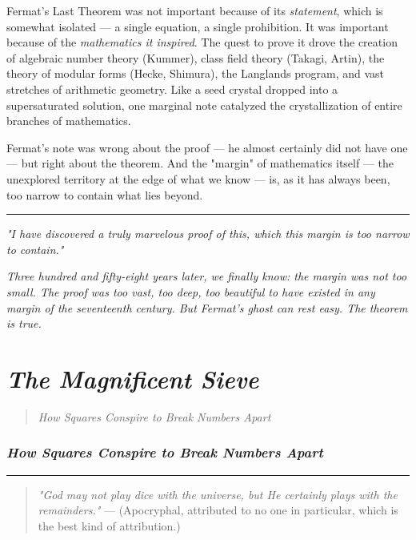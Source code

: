 \documentclass[11pt,openany]{book}
\theoremstyle{definition}
\theoremstyle{plain}
\theoremstyle{remark}
\begin{document}
Fermat's Last Theorem was not important because of its \textit{statement}, which is somewhat isolated — a single equation, a single prohibition. It was important because of the \textit{mathematics it inspired}. The quest to prove it drove the creation of algebraic number theory (Kummer), class field theory (Takagi, Artin), the theory of modular forms (Hecke, Shimura), the Langlands program, and vast stretches of arithmetic geometry. Like a seed crystal dropped into a supersaturated solution, one marginal note catalyzed the crystallization of entire branches of mathematics.

Fermat's note was wrong about the proof — he almost certainly did not have one — but right about the theorem. And the "margin" of mathematics itself — the unexplored territory at the edge of what we know — is, as it has always been, too narrow to contain what lies beyond.

\bigskip\noindent\rule{\textwidth}{0.4pt}\bigskip


\textit{"I have discovered a truly marvelous proof of this, which this margin is too narrow to contain."}

\textit{Three hundred and fifty-eight years later, we finally know: the margin was not too small. The proof was too vast, too deep, too beautiful to have existed in any margin of the seventeenth century. But Fermat's ghost can rest easy. The theorem is true.}

\clearpage

\chapter{\textit{The Magnificent Sieve}}
\begin{quote}\textit{How Squares Conspire to Break Numbers Apart}\end{quote}



\subsection*{\textit{How Squares Conspire to Break Numbers Apart}}


\bigskip\noindent\rule{\textwidth}{0.4pt}\bigskip


\begin{quote}
\textit{"God may not play dice with the universe, but He certainly plays with the remainders."}
— (Apocryphal, attributed to no one in particular, which is the best kind of attribution.)
\end{quote}
\end{document}
